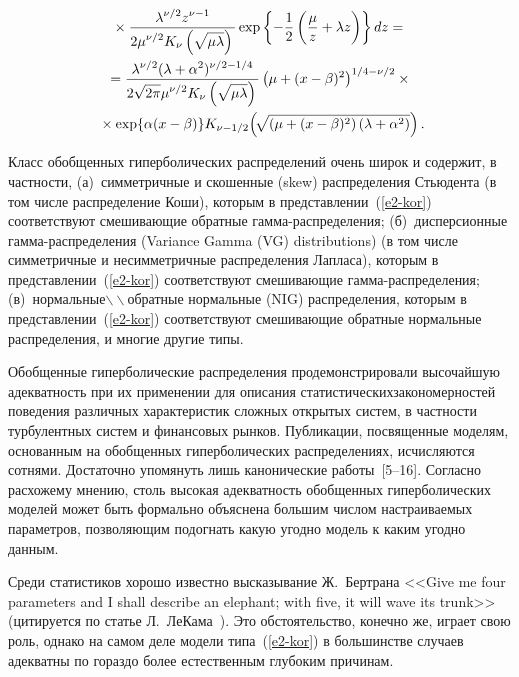 \begin{multicols}{2}
\noindent
\begin{multline*}
{}\times \displaystyle\frac{\displaystyle \lambda^{\nu/2}z^{\nu-1}\mathstrut}{\displaystyle 2\mu^{\nu/2}K_{\nu}
\left(\sqrt{\mu\lambda}\right)\mathstrut} \exp\left\{-\displaystyle\frac{\displaystyle 1\mathstrut}{\displaystyle 2\mathstrut}\left(\displaystyle\frac{\displaystyle \mu
\mathstrut}{\displaystyle z\mathstrut}+\lambda  z\right)\right\}dz={}
\\
{}=\displaystyle\frac{\displaystyle \lambda^{\nu/2}(\lambda
+\alpha^2)^{\nu/2-1/4}\mathstrut}{\displaystyle 2\sqrt{2\pi}\mu^{\nu/2}K_{\nu}\left(\sqrt{\mu\lambda}\right)\mathstrut}
\left(\mu +(x-\beta)^2\right)^{1/4-\nu/2}\times{}\\
{}\times\exp\{\alpha
(x-\beta)\}K_{\nu-1/2}\!\left(\!\sqrt{\left(\mu
+(x-\beta)^2\right)\left(\lambda  +\alpha^2\right)}\right).\hspace*{-3.10736pt}
\end{multline*}

Класс обобщенных гиперболических распределений очень широк и
содержит, в частности, (а)~симметричные и скошенные (skew)
распределения Стьюдента (в том числе распределение Коши), которым в
представлении~(\ref{e2-kor}) соответствуют смешивающие обратные
гам\-ма-рас\-пре\-де\-ле\-ния; (б)~дис\-пер\-си\-он\-ные гам\-ма-рас\-пре\-де\-ле\-ния
(Variance Gamma (VG) distributions) (в том чис\-ле симметричные и
несимметричные распределения Лапласа), которым в представлении~(\ref{e2-kor})
соответствуют смешивающие гам\-ма-рас\-пре\-де\-ле\-ния; 
(в)~нормальные$\backslash\!\backslash$обратные нормальные (NIG)
распределения, которым в представлении~(\ref{e2-kor}) соответствуют смешивающие
обратные нормальные распределения, и многие другие типы.

Обобщенные гиперболические распределения продемонстрировали
высочайшую адекватность при их применении для описания
статистических\linebreak закономерностей поведения различных харак\-те\-ристик
сложных открытых сис\-тем, в част\-ности тур\-булентных сис\-тем и
финансовых рынков. Пуб\-ли\-кации, посвященные моделям, основанным на\linebreak
обобщенных гиперболических распределениях, ис\-чис\-ля\-ют\-ся сотнями.
Достаточно упомянуть лишь канонические работы~[5--16]. %
Согласно расхожему мнению, столь
высокая адекватность обобщенных гиперболических моделей может быть
формально объяснена большим числом настраиваемых параметров,
позволяющим подогнать какую угодно модель к каким угодно данным.

Среди статистиков хорошо известно высказывание Ж.~Берт\-ра\-на <<Give
me four parameters and I shall describe an elephant; with five, it
will wave its trunk>> (цитируется по статье Л.~ЛеКама~\cite{LeCam1990}). 
Это обстоятельство, конечно же, играет свою роль,
однако на самом деле модели типа~(\ref{e2-kor}) в большинстве случаев адекватны
по гораздо более естественным глубоким причинам.


\end{multicols}

